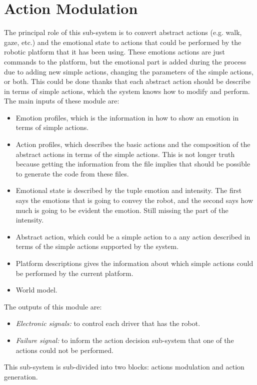 \section{Action Modulation}
The principal role of this sub-system is to convert abstract actions (e.g. walk, gaze, etc.) and the emotional state to actions that could be performed by the robotic platform that it has been using. These emotions actions are just commands to the platform, but the emotional part is added during the process due to adding new simple actions, changing the parameters of the simple actions, or both. This could be done thanks that each abstract action should be describe in terms of simple actions, which the system knows how to modify and perform. The main inputs of these module are:
\begin{itemize}
	\item Emotion profiles, which is the information in how to show an emotion in terms of simple actions.
	\item Action profiles, which describes the basic actions and the composition of the abstract actions in terms of the simple actions. This is not longer truth because getting the information from the file implies that should be possible to generate the code from these files.
	\item Emotional state is described by the tuple emotion and intensity. The first says the emotions that is going to convey the robot, and the second says how much is going to be evident the emotion. Still missing the part of the intensity.
	\item Abstract action, which could be a simple action to a any action described in terms of the simple actions supported by the system.	
	\item Platform descriptions gives the information about which simple actions could be performed by the current platform.
	\item World model.
\end{itemize} 
The outputs of this module are:
\begin{itemize}
	\item \textit{Electronic signals:} to control each driver that has the robot.
	\item \textit{Failure signal:} to inform the action decision sub-system that one of the actions could not be performed.
\end{itemize}
This sub-system is sub-divided into two blocks: actions modulation and action generation.
